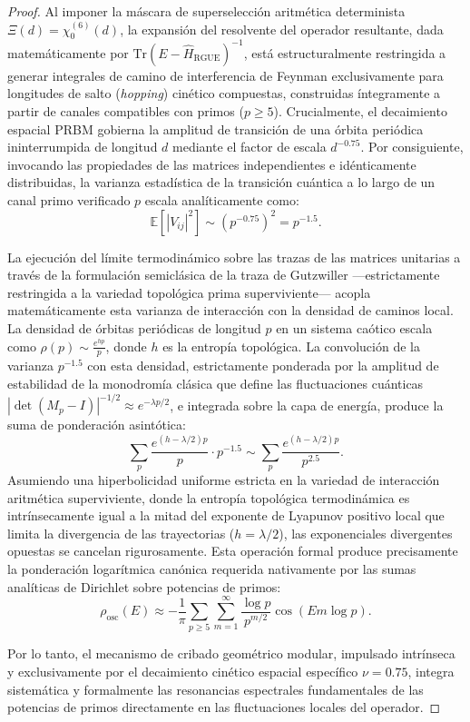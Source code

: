 \documentclass[aps,prl,preprint,superscriptaddress,floatfix]{revtex4-2}
\begin{document}
\begin{proof}
Al imponer la máscara de superselección aritmética determinista $\Xi(d) = \chi_0^{(6)}(d)$, la expansión del resolvente del operador resultante, dada matemáticamente por $\text{Tr}(E - \hat{H}_{\text{RGUE}})^{-1}$, está estructuralmente restringida a generar integrales de camino de interferencia de Feynman exclusivamente para longitudes de salto (\textit{hopping}) cinético compuestas, construidas íntegramente a partir de canales compatibles con primos ($p \ge 5$). Crucialmente, el decaimiento espacial PRBM gobierna la amplitud de transición de una órbita periódica ininterrumpida de longitud $d$ mediante el factor de escala $d^{-0.75}$. Por consiguiente, invocando las propiedades de las matrices independientes e idénticamente distribuidas, la varianza estadística de la transición cuántica a lo largo de un canal primo verificado $p$ escala analíticamente como:
\begin{equation}
\mathbb{E}[|V_{ij}|^2] \sim (p^{-0.75})^2 = p^{-1.5}.
\end{equation}

La ejecución del límite termodinámico sobre las trazas de las matrices unitarias a través de la formulación semiclásica de la traza de Gutzwiller —estrictamente restringida a la variedad topológica prima superviviente— acopla matemáticamente esta varianza de interacción con la densidad de caminos local. La densidad de órbitas periódicas de longitud $p$ en un sistema caótico escala como $\rho(p) \sim \frac{e^{h p}}{p}$, donde $h$ es la entropía topológica. La convolución de la varianza $p^{-1.5}$ con esta densidad, estrictamente ponderada por la amplitud de estabilidad de la monodromía clásica que define las fluctuaciones cuánticas $|\det(M_p - I)|^{-1/2} \approx e^{-\lambda p / 2}$, e integrada sobre la capa de energía, produce la suma de ponderación asintótica:
\begin{equation}
\sum_{p} \frac{e^{(h - \lambda/2) p}}{p} \cdot p^{-1.5} \sim \sum_{p} \frac{e^{(h - \lambda/2) p}}{p^{2.5}}.
\end{equation}
Asumiendo una hiperbolicidad uniforme estricta en la variedad de interacción aritmética superviviente, donde la entropía topológica termodinámica es intrínsecamente igual a la mitad del exponente de Lyapunov positivo local que limita la divergencia de las trayectorias ($h = \lambda / 2$), las exponenciales divergentes opuestas se cancelan rigurosamente. Esta operación formal produce precisamente la ponderación logarítmica canónica requerida nativamente por las sumas analíticas de Dirichlet sobre potencias de primos:
\begin{equation}
\rho_{\text{osc}}(E) \approx -\frac{1}{\pi} \sum_{p \ge 5} \sum_{m=1}^{\infty} \frac{\log p}{p^{m/2}} \cos(E m \log p).
\end{equation}

Por lo tanto, el mecanismo de cribado geométrico modular, impulsado intrínseca y exclusivamente por el decaimiento cinético espacial específico $\nu=0.75$, integra sistemática y formalmente las resonancias espectrales fundamentales de las potencias de primos directamente en las fluctuaciones locales del operador.
\end{proof}
\end{document}
